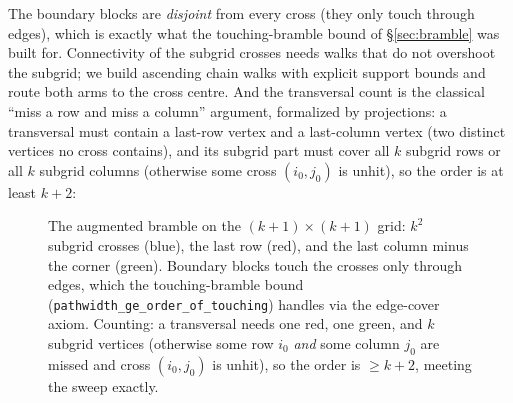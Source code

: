 \documentclass[sigplan,10pt,screen,review,anonymous]{acmart}
\begin{document}
The boundary blocks are \emph{disjoint}
from every cross (they only touch through edges), which is exactly what the
touching-bramble bound of \S\ref{sec:bramble} was built for. Connectivity of the
subgrid crosses needs walks that do not overshoot the subgrid; we build ascending chain
walks with explicit support bounds and route both arms to the cross centre. And the
transversal count is the classical ``miss a row and miss a column'' argument, formalized by
projections: a transversal must contain a last-row vertex and a last-column vertex (two
distinct vertices no cross contains), and its subgrid part must cover all $k$ subgrid rows
or all $k$ subgrid columns (otherwise some cross $(i_0, j_0)$ is unhit), so the order
is at least $k+2$:
\begin{figure}[t]
\centering
{}
\caption{The augmented bramble on the $(k{+}1)\times(k{+}1)$ grid: $k^2$ subgrid crosses
(blue), the last row (red), and the last column minus the corner (green). Boundary blocks
touch the crosses only through edges, which the touching-bramble bound
(\lstinline|pathwidth_ge_order_of_touching|) handles via the edge-cover axiom. Counting: a
transversal needs one red, one green, and $k$ subgrid vertices (otherwise some row $i_0$
\emph{and} some column $j_0$ are missed and cross $(i_0,j_0)$ is unhit), so the order is
$\ge k+2$, meeting the sweep exactly.}
\label{fig:augmented}
\end{figure}
\end{document}
